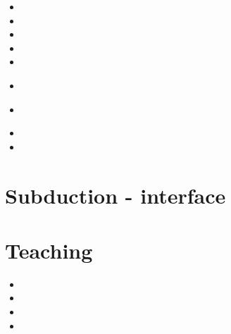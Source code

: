 \begin{scriptsize}
\begin{itemize}
\item[\twothousandthree] 
\item[\twothousandsix] 
\item[\twothousandnine] 
\item[\twothousandnine] 
\item[\twothousandtwelve] 
\item[\twothousandthirteen] 
 \\
\item[\twothousandfourteen]
 \\
\item[\twothousandfifteen]
\item[\twothousandtwenty]
\end{itemize}
\end{scriptsize}


\section{Subduction - interface} 



\section{Teaching} 

\begin{scriptsize}
\begin{itemize}
\item[\twothousandeleven]
\item[\twothousandfourteen]
\item[\twothousandnineteen] 
\item[\twothousandtwentyone] 
\end{itemize}
\end{scriptsize}

